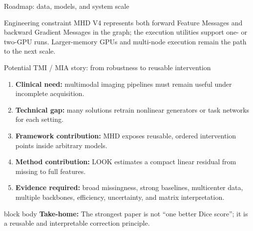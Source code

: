 \documentclass[aspectratio=169,11pt]{beamer}
\newcommand{\takeaway}[1]{%
  \vfill
  \begin{beamercolorbox}[rounded=true,sep=0.7ex,leftskip=0.8ex]{block body}%
    \textbf{Take-home:} #1
  \end{beamercolorbox}%
}
\begin{document}
\begin{frame}{Roadmap: data, models, and system scale}
  \vspace{5mm}
  \begin{alertblock}{Engineering constraint}
    MHD V4 represents both forward Feature Messages and backward Gradient Messages in the graph;
    the execution utilities support one- or two-GPU runs.
    Larger-memory GPUs and multi-node execution remain the path to the next scale.
  \end{alertblock}
\end{frame}

\begin{frame}{Potential TMI / MIA story: from robustness to reusable intervention}
  \begin{enumerate}
    \item \textbf{Clinical need:} multimodal imaging pipelines must remain useful under incomplete acquisition.
    \item \textbf{Technical gap:} many solutions retrain nonlinear generators or task networks for each setting.
    \item \textbf{Framework contribution:} MHD exposes reusable, ordered intervention points inside arbitrary models.
    \item \textbf{Method contribution:} LOOK estimates a compact linear residual from missing to full features.
    \item \textbf{Evidence required:} broad missingness, strong baselines, multicenter data, multiple backbones,
          efficiency, uncertainty, and matrix interpretation.
  \end{enumerate}
  \takeaway{The strongest paper is not ``one better Dice score''; it is a reusable and interpretable correction principle.}
\end{frame}
\end{document}
